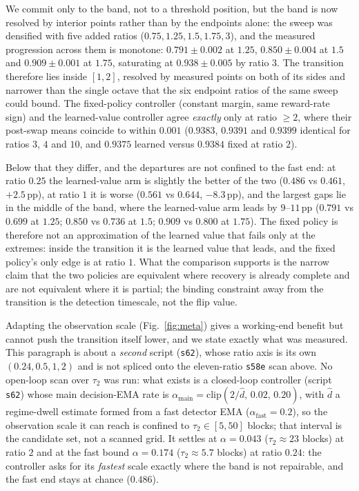 \documentclass[preprint,12pt]{elsarticle}
\begin{document}
We commit only to the band, not to a
threshold position, but the band is now resolved by interior points rather
than by the endpoints alone: the sweep was densified with five added ratios
($0.75,1.25,1.5,1.75,3$), and the measured progression across them is
monotone: $0.791\pm0.002$ at $1.25$, $0.850\pm0.004$ at $1.5$ and
$0.909\pm0.001$ at $1.75$, saturating at $0.938\pm0.005$ by ratio $3$. The
transition therefore lies inside $[1,2]$, resolved by measured points on both
of its sides and narrower than the single octave that the six endpoint ratios
of the same sweep could bound. The fixed-policy controller (constant margin,
same reward-rate sign) and the learned-value controller agree
\emph{exactly} only at ratio $\geq2$, where their post-swap means coincide to
within $0.001$ ($0.9383$, $0.9391$ and $0.9399$ identical for ratios $3$, $4$
and $10$, and $0.9375$ learned versus $0.9384$ fixed at ratio $2$).

Below that they differ, and the
departures are not confined to the fast end: at ratio $0.25$ the learned-value
arm is slightly the better of the two ($0.486$ vs $0.461$, $+2.5$\,pp), at
ratio $1$ it is worse ($0.561$ vs $0.644$, $-8.3$\,pp), and the largest gaps
lie in the middle of the band, where the learned-value arm leads by
$9$--$11$\,pp
($0.791$ vs $0.699$ at $1.25$; $0.850$ vs $0.736$ at $1.5$; $0.909$ vs $0.800$
at $1.75$). The fixed policy is therefore not an approximation of the learned
value that fails only at the extremes: inside the transition it is the learned value
that leads, and the fixed policy's only edge is at ratio $1$. What the comparison supports is the narrow claim
that the two policies are equivalent where recovery is already complete and
are not equivalent where it is partial; the binding constraint away from the
transition is the detection timescale, not the flip value.

Adapting the
observation scale (Fig.~\ref{fig:meta}) gives a working-end benefit but cannot
push the transition itself lower, and we state exactly what was measured.
This paragraph is about a \emph{second} script (\texttt{s62}), whose
ratio axis is its own $(0.24,0.5,1,2)$ and is not spliced onto the
eleven-ratio \texttt{s58e} scan above. No
open-loop scan over $\tau_2$ was run: what exists is a closed-loop controller
(script \texttt{s62}) whose main decision-EMA rate is
$\alpha_{\mathrm{main}}=\mathrm{clip}(2/\hat d,\,0.02,\,0.20)$, with $\hat d$ a
regime-dwell estimate formed from a fast detector EMA
($\alpha_{\mathrm{fast}}=0.2$), so the observation scale it can reach is
confined to $\tau_2\in[5,50]$ blocks; that interval is the candidate set,
not a scanned grid. It settles at $\alpha=0.043$ ($\tau_2\approx23$ blocks) at
ratio $2$ and at the fast bound $\alpha=0.174$ ($\tau_2\approx5.7$ blocks) at
ratio $0.24$: the controller asks for its \emph{fastest} scale exactly where
the band is not repairable, and the fast end stays at chance ($0.486$).
\end{document}
